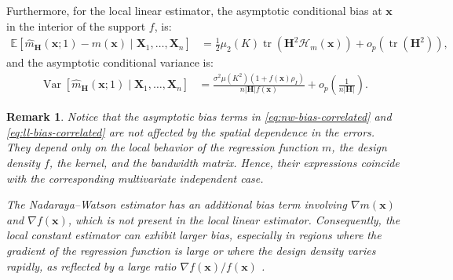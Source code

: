 \documentclass[12pt]{report} %
\newtheorem{theorem}{Theorem}
\newtheorem{remark}{Remark}
\newcommand{\bH}{\mathbf{H}}
\newcommand{\bX}{\mathbf{X}}
\newcommand{\bx}{\mathbf{x}}
\newcommand{\lc}{\left[}
\newcommand{\rc}{\right]}
\newcommand{\V}[1]{\mathbb{V}\mathrm{ar}\lc #1\rc}
\begin{document}
Furthermore, for the local linear estimator, the asymptotic conditional bias at $\bx$ in the interior of the support $f$, is: 
\begin{align}
    \label{eq:ll-bias-correlated}
    \mathbb{E}\!\left[\hat{m}_{\bH}(\bx;1)-m(\bx)\mid \bX_1,\ldots,\bX_n\right]
    &= \frac{1}{2}\mu_2(K) \operatorname{tr}\!\left(\bH^2\mathcal{H}_m(\bx)\right)
    + o_p\!\left(\operatorname{tr}(\bH^2)\right),
\end{align}
and the asymptotic conditional variance is: 
\begin{align}
    \label{eq:ll-variance-correlated}
    \operatorname{Var}\!\left[ \hat{m}_{\bH}(\bx;1) \mid \bX_1,\ldots,\bX_n \right]
    &= \frac{\sigma^2\mu(K^2)\left(1+f(\bx)\rho_I\right)}{
        n|\bH|f(\bx)} + o_p\!\left(\frac{1}{n|\bH|}\right).
\end{align}

\begin{remark}
Notice that the asymptotic bias terms in \eqref{eq:nw-bias-correlated} and \eqref{eq:ll-bias-correlated} are not affected by the spatial dependence in the errors. They depend only on the local behavior of the regression function $m$, the design density $f$, the kernel, and the bandwidth matrix. Hence, their expressions coincide with the corresponding multivariate independent case.

The Nadaraya--Watson estimator has an additional bias term involving $\nabla m(\bx)$ and $\nabla f(\bx)$, which is not present in the local linear estimator. Consequently, the local constant estimator can exhibit larger bias, especially
in regions where the gradient of the regression function is large or where the design density varies rapidly, as reflected by a large ratio $\nabla f(\bx)/f(\bx)$ \citep{Fan1996}.
\end{remark}
\end{document}
